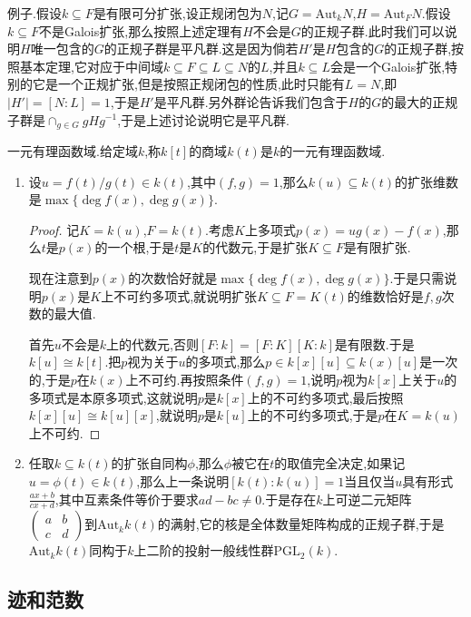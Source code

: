 例子.假设$k\subseteq F$是有限可分扩张,设正规闭包为$N$,记$G=\mathrm{Aut}_kN$,$H=\mathrm{Aut}_FN$.假设$k\subseteq F$不是Galois扩张,那么按照上述定理有$H$不会是$G$的正规子群.此时我们可以说明$H$唯一包含的$G$的正规子群是平凡群.这是因为倘若$H'$是$H$包含的$G$的正规子群,按照基本定理,它对应于中间域$k\subseteq F\subseteq L\subseteq N$的$L$,并且$k\subseteq L$会是一个Galois扩张,特别的它是一个正规扩张,但是按照正规闭包的性质,此时只能有$L=N$,即$|H'|=[N:L]=1$,于是$H'$是平凡群.另外群论告诉我们包含于$H$的$G$的最大的正规子群是$\cap_{g\in G}gHg^{-1}$,于是上述讨论说明它是平凡群.

一元有理函数域.给定域$k$,称$k[t]$的商域$k(t)$是$k$的一元有理函数域.
\begin{enumerate}
	\item 设$u=f(t)/g(t)\in k(t)$,其中$(f,g)=1$,那么$k(u)\subseteq k(t)$的扩张维数是$\max\{\deg f(x),\deg g(x)\}$.
	\begin{proof}
		
		记$K=k(u)$,$F=k(t)$.考虑$K$上多项式$p(x)=ug(x)-f(x)$,那么$t$是$p(x)$的一个根,于是$t$是$K$的代数元,于是扩张$K\subseteq F$是有限扩张.
		
		现在注意到$p(x)$的次数恰好就是$\max\{\deg f(x),\deg g(x)\}$.于是只需说明$p(x)$是$K$上不可约多项式,就说明扩张$K\subseteq F=K(t)$的维数恰好是$f,g$次数的最大值.
		
		首先$u$不会是$k$上的代数元,否则$[F:k]=[F:K][K:k]$是有限数.于是$k[u]\cong k[t]$.把$p$视为关于$u$的多项式,那么$p\in k[x][u]\subseteq k(x)[u]$是一次的,于是$p$在$k(x)$上不可约.再按照条件$(f,g)=1$,说明$p$视为$k[x]$上关于$u$的多项式是本原多项式,这就说明$p$是$k[x]$上的不可约多项式,最后按照$k[x][u]\cong k[u][x]$,就说明$p$是$k[u]$上的不可约多项式,于是$p$在$K=k(u)$上不可约.
	\end{proof}
    \item 任取$k\subseteq k(t)$的扩张自同构$\phi$,那么$\phi$被它在$t$的取值完全决定,如果记$u=\phi(t)\in k(t)$,那么上一条说明$[k(t):k(u)]=1$当且仅当$u$具有形式$\frac{ax+b}{cx+d}$,其中互素条件等价于要求$ad-bc\not=0$.于是存在$k$上可逆二元矩阵$\left(\begin{array}{cc} a&b\\c&d\end{array}\right)$到$\mathrm{Aut}_kk(t)$的满射,它的核是全体数量矩阵构成的正规子群,于是$\mathrm{Aut}_kk(t)$同构于$k$上二阶的投射一般线性群$\mathrm{PGL}_2(k)$.
\end{enumerate}
\newpage
\subsection{迹和范数}

